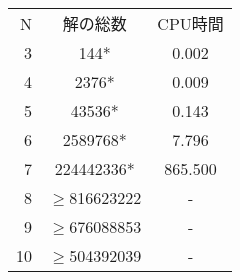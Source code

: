 \begin{table}[tb]
\begin{tabular}{r|c|c}
 \hline
 N& 解の総数& CPU時間\\
 3&144*&0.002\\
 4&2376*&0.009\\
 5&43536*&0.143\\
 6&2589768*&7.796\\
 7&224442336*&865.500\\
 8&$\geq$816623222&-\\
 9&$\geq$676088853&-\\
 10&$\geq$504392039&-\\
\end{tabular}
\end{table}